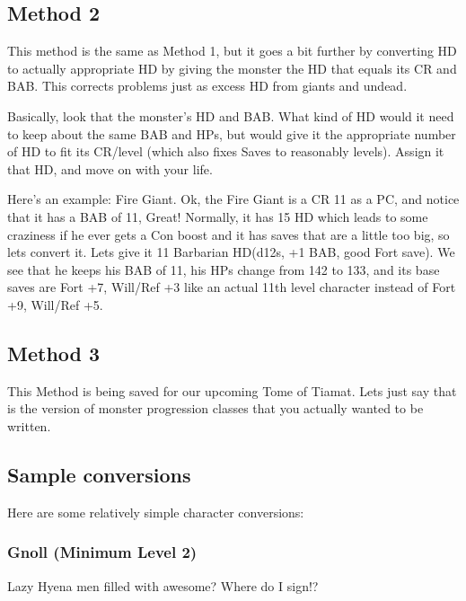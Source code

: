 \subsection{Method 2}
This method is the same as Method 1, but it goes a bit further by converting HD to actually appropriate HD by giving the monster the HD that equals its CR and BAB. This corrects problems just as excess HD from giants and undead.

Basically, look that the monster's HD and BAB. What kind of HD would it need to keep about the same BAB and HPs, but would give it the appropriate number of HD to fit its CR/level (which also fixes Saves to reasonably levels). Assign it that HD, and move on with your life.

Here's an example:
Fire Giant. Ok, the Fire Giant is a CR 11 as a PC, and notice that it has a BAB of 11, Great! Normally, it has 15 HD which leads to some craziness if he ever gets a Con boost and it has saves that are a little too big, so lets convert it. Lets give it 11 Barbarian HD(d12s, +1 BAB, good Fort save). We see that he keeps his BAB of 11, his HPs change from 142 to 133, and its base saves are Fort +7, Will/Ref +3 like an actual 11th level character instead of Fort +9, Will/Ref +5.

\subsection{Method 3}
This Method is being saved for our upcoming Tome of Tiamat. Lets just say that is the version of monster progression classes that you actually wanted to be written.

\subsection{Sample conversions}

Here are some relatively simple character conversions:

\subsubsection{Gnoll (Minimum Level 2)}

Lazy Hyena men filled with awesome? Where do I sign!?

